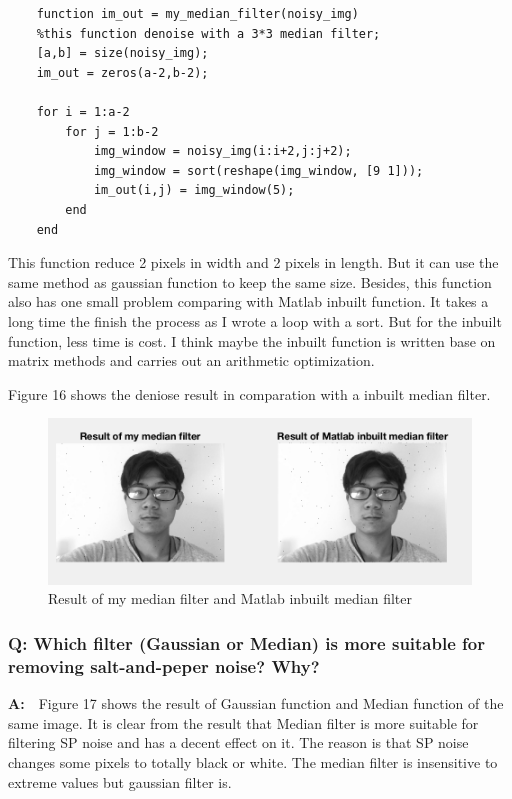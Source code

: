 \documentclass{article}
\begin{document}
\begin{lstlisting}
    function im_out = my_median_filter(noisy_img)
    %this function denoise with a 3*3 median filter;
    [a,b] = size(noisy_img);
    im_out = zeros(a-2,b-2);
    
    for i = 1:a-2
        for j = 1:b-2
            img_window = noisy_img(i:i+2,j:j+2);
            img_window = sort(reshape(img_window, [9 1]));
            im_out(i,j) = img_window(5);
        end
    end
\end{lstlisting}

This function reduce 2 pixels in width and 2 pixels in length. But it can use the same method as gaussian function to keep the same size. Besides, this function also has one small problem comparing with Matlab inbuilt function. It takes a long time the finish the process as I wrote a loop with a sort. But for the inbuilt function, less time is cost. I think maybe the inbuilt function is written base on matrix methods and carries out an arithmetic optimization.

Figure 16 shows the deniose result in comparation with a inbuilt median filter.



\begin{figure}[htbp]
    \centering
    \includegraphics[scale = 0.6]{fig13.jpg}
    \caption{Result of my median filter and Matlab inbuilt median filter}
    \label{fig13}
\end{figure}

\subsubsection*{Q: Which filter (Gaussian or Median) is more suitable for removing salt-and-peper noise? Why?}
\textbf{A:}~~Figure 17 shows the result of Gaussian function and Median function of the same image. It is clear from the result that Median filter is more suitable for filtering SP noise and has a decent effect on it. The reason is that SP noise changes some pixels to totally black or white. The median filter is insensitive to extreme values but gaussian filter is.
\end{document}

